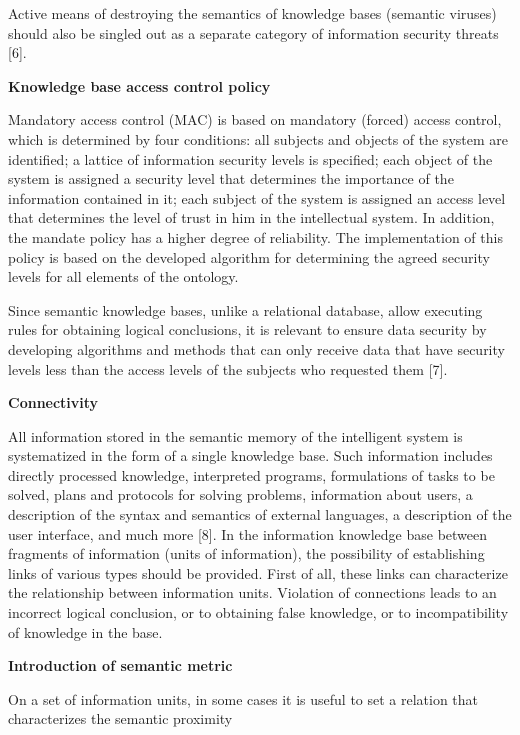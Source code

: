 \documentclass{article}
\begin{document}
\begin{multicols}{2}


Active means of destroying the semantics of knowledge
bases (semantic viruses) should also be singled out as a
separate category of information security threats [6].

\textbf{Knowledge base access control policy}

Mandatory access control (MAC) is based on mandatory (forced) access control, which is determined by
four conditions: all subjects and objects of the system
are identified; a lattice of information security levels is
specified; each object of the system is assigned a security
level that determines the importance of the information
contained in it; each subject of the system is assigned an
access level that determines the level of trust in him in
the intellectual system. In addition, the mandate policy
has a higher degree of reliability. The implementation
of this policy is based on the developed algorithm for
determining the agreed security levels for all elements of
the ontology.
\par
Since semantic knowledge bases, unlike a relational
database, allow executing rules for obtaining logical
conclusions, it is relevant to ensure data security by
developing algorithms and methods that can only receive
data that have security levels less than the access levels
of the subjects who requested them [7].
\par
\textbf{Connectivity}
\par
All information stored in the semantic memory of
the intelligent system is systematized in the form of a
single knowledge base. Such information includes directly
processed knowledge, interpreted programs, formulations
of tasks to be solved, plans and protocols for solving problems, information about users, a description of the syntax
and semantics of external languages, a description of the
user interface, and much more [8]. In the information
knowledge base between fragments of information (units
of information), the possibility of establishing links of
various types should be provided. First of all, these links
can characterize the relationship between information
units. Violation of connections leads to an incorrect
logical conclusion, or to obtaining false knowledge, or
to incompatibility of knowledge in the base.
\par
\textbf{Introduction of semantic metric}
\par
On a set of information units, in some cases it is useful
to set a relation that characterizes the semantic proximity

\end{multicols}
\end{document}
